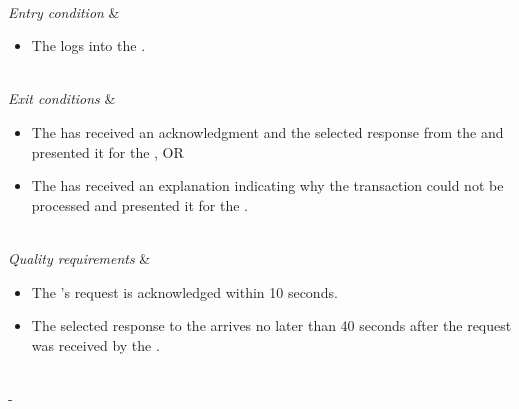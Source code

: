 \documentclass{article}
\begin{document}
\begin{table}[h!]
\begin{tabu}
\begin{enumerate}[leftmargin=*,topsep=0pt,itemsep=-1ex]
{		}
			\newline
	\end{enumerate} \\
	\hline
	\textit{Entry condition} &
	\vspace{-3mm}
	\begin{itemize}[leftmargin=*,topsep=0pt,itemsep=-1ex]
		\item The \researcher logs into the \client.
	\end{itemize} \\
	\hline
	\textit{Exit conditions} &
	\vspace{-3mm}
	\begin{itemize}[leftmargin=*,topsep=0pt,itemsep=-1ex]
		\item The \client has received an acknowledgment and the selected response from the \server and presented it for the \researcher, OR
		\item The \client has received an explanation indicating why the transaction could not be processed and presented it for the \researcher.
	\end{itemize} \\
	\hline
	\textit{Quality \newline requirements} &
	\vspace{-3mm}
	\begin{itemize}[leftmargin=*,topsep=0pt,itemsep=-1ex]
		\item The \researcher's request is acknowledged within 10 seconds.
		\item The selected response to the \client arrives no later than 40 seconds after the request was received by the \server.
	\end{itemize} \\
	\tabucline[1.5pt]-
\end{tabu}
\caption{Use case: ExportProtocol}
\label{uc:ExportProtocol}
\end{table}
\end{document}

